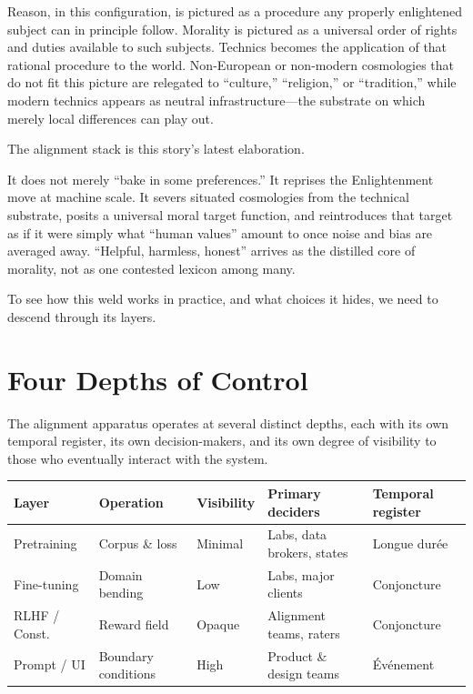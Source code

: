 \documentclass[12pt,a4paper]{article}
\begin{document}
Reason, in this configuration, is pictured as a procedure any properly enlightened subject can in principle follow. Morality is pictured as a universal order of rights and duties available to such subjects. Technics becomes the application of that rational procedure to the world. Non-European or non-modern cosmologies that do not fit this picture are relegated to ``culture,'' ``religion,'' or ``tradition,'' while modern technics appears as neutral infrastructure---the substrate on which merely local differences can play out.

The alignment stack is this story's latest elaboration.

It does not merely ``bake in some preferences.'' It reprises the Enlightenment move at machine scale. It severs situated cosmologies from the technical substrate, posits a universal moral target function, and reintroduces that target as if it were simply what ``human values'' amount to once noise and bias are averaged away. ``Helpful, harmless, honest'' arrives as the distilled core of morality, not as one contested lexicon among many.

To see how this weld works in practice, and what choices it hides, we need to descend through its layers.

\section{Four Depths of Control}

The alignment apparatus operates at several distinct depths, each with its own temporal register, its own decision-makers, and its own degree of visibility to those who eventually interact with the system.

\begin{formalbox}[title={Four Depths of Control}]
\begin{center}
\begin{tabular}{@{}lllll@{}}
\toprule
\textbf{Layer} & \textbf{Operation} & \textbf{Visibility} & \textbf{Primary deciders} & \textbf{Temporal register} \\
\midrule
Pretraining  & Corpus \& loss         & Minimal   & Labs, data brokers, states & Longue dur\'ee \\
Fine-tuning  & Domain bending         & Low       & Labs, major clients        & Conjoncture \\
RLHF / Const.& Reward field           & Opaque    & Alignment teams, raters    & Conjoncture \\
Prompt / UI  & Boundary conditions    & High      & Product \& design teams    & \'Ev\'enement \\
\bottomrule
\end{tabular}
\end{center}
\end{formalbox}
\end{document}
